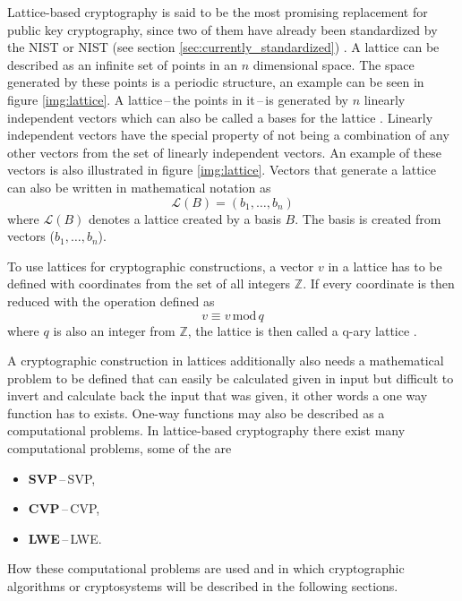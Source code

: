 Lattice-based cryptography is said to be the most promising replacement for public key cryptography, since two of them have already been standardized by the \acl{NIST} or NIST (see section \ref{sec:currently_standardized}) \cite{Alagic2022}. A lattice can be described as an infinite set of points in an $n$ dimensional space. The space generated by these points is a periodic structure, an example can be seen in figure \ref{img:lattice}. A lattice\,--\,the points in it\,--\,is generated by $n$ linearly independent vectors which can also be called a bases for the lattice \cite{Ajati1996}. Linearly independent vectors have the special property of not being a combination of any other vectors from the set of linearly independent vectors. An example of these vectors is also illustrated in figure \ref{img:lattice}. Vectors that generate a lattice can also be written in mathematical notation as
\begin{equation}
  \mathcal{L}(B)=(b_1,\dots,b_n)
\end{equation}
where $\mathcal{L}(B)$ denotes a lattice created by a basis $B$. The basis is created from vectors ($b_1,\dots,b_n$).


To use lattices for cryptographic constructions, a vector $v$ in a lattice has to be defined with coordinates from the set of all integers $\mathbb{Z}$. If every coordinate is then reduced with the operation defined as
\begin{equation}
  v\equiv v\,\mathrm{mod}\,q
\end{equation}
where $q$ is also an integer from $\mathbb{Z}$, the lattice is then called a q-ary lattice \cite{Bernstein2009}.

A cryptographic construction in lattices additionally also needs a mathematical problem to be defined that can easily be calculated given in input but difficult to invert and calculate back the input that was given, it other words a one way function has to exists. One-way functions may also be described as a computational problems. In lattice-based cryptography there exist many computational problems, some of the are
\begin{itemize}
  \item \textbf{SVP}\,--\,\acl{SVP},
  \item \textbf{CVP}\,--\,\acl{CVP},
  \item \textbf{LWE}\,--\,\acl{LWE}\cite{Bernstein2009}.
\end{itemize}
How these computational problems are used and in which cryptographic algorithms or cryptosystems will be described in the following sections.

